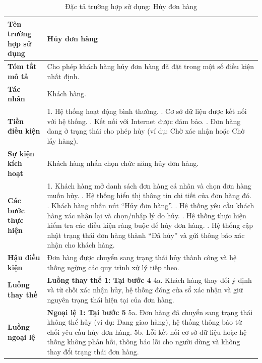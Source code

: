 \begin{longtable}{|>{\bfseries}p{4cm}|p{11.5cm}|}
\caption{Đặc tả trường hợp sử dụng: Hủy đơn hàng}
\label{tab:uc-cancel-order} \\
\hline
\textbf{Tên trường hợp sử dụng} & Hủy đơn hàng \\
\hline
\textbf{Tóm tắt mô tả} & Cho phép khách hàng hủy đơn hàng đã đặt trong một số điều kiện nhất định. \\
\hline
\textbf{Tác nhân} & Khách hàng. \\
\hline
\textbf{Tiền điều kiện} & 1. Hệ thống hoạt động bình thường. \newline
2. Cơ sở dữ liệu được kết nối với hệ thống. \newline
3. Kết nối với Internet được đảm bảo. \newline
4. Đơn hàng đang ở trạng thái cho phép hủy (ví dụ: Chờ xác nhận hoặc Chờ lấy hàng). \\
\hline
\textbf{Sự kiện kích hoạt} & Khách hàng nhấn chọn chức năng hủy đơn hàng. \\
\hline
\textbf{Các bước thực hiện} & 1. Khách hàng mở danh sách đơn hàng cá nhân và chọn đơn hàng muốn hủy. \newline
2. Hệ thống hiển thị thông tin chi tiết của đơn hàng đó. \newline
3. Khách hàng nhấn nút “Hủy đơn hàng”. \newline
4. Hệ thống yêu cầu khách hàng xác nhận lại và chọn/nhập lý do hủy. \newline
5. Hệ thống thực hiện kiểm tra các điều kiện ràng buộc để hủy đơn hàng. \newline
6. Hệ thống cập nhật trạng thái đơn hàng thành “Đã hủy” và gửi thông báo xác nhận cho khách hàng. \\
\hline
\textbf{Hậu điều kiện} & Đơn hàng được chuyển sang trạng thái hủy thành công và hệ thống ngừng các quy trình xử lý tiếp theo. \\
\hline
\textbf{Luồng thay thế} & \textbf{Luồng thay thế 1: Tại bước 4} \newline
4a. Khách hàng thay đổi ý định và từ chối xác nhận hủy, hệ thống đóng cửa sổ xác nhận và giữ nguyên trạng thái hiện tại của đơn hàng. \\
\hline
\textbf{Luồng ngoại lệ} & \textbf{Ngoại lệ 1: Tại bước 5} \newline
5a. Đơn hàng đã chuyển sang trạng thái không thể hủy (ví dụ: Đang giao hàng), hệ thống thông báo từ chối yêu cầu hủy đơn hàng. \newline
5b. Lỗi kết nối cơ sở dữ liệu hoặc hệ thống không phản hồi, thông báo lỗi cho người dùng và không thay đổi trạng thái đơn hàng. \\
\hline
\end{longtable}

